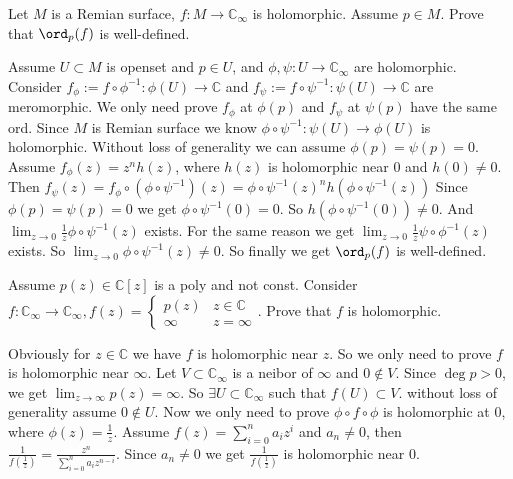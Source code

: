 \documentclass{ctexart}
\begin{document}
\begin{problem}
  Let \(M\) is a Remian surface, \(f:M \to \mathbb{C}_{\infty}\) is holomorphic. Assume \(p \in M\). 
  Prove that \(\ord_p(f)\) is well-defined. 
\end{problem}

\begin{solution}
  Assume \(U \subset M\) is openset and \(p \in U\), and \(\phi,\psi:U \to \mathbb{C}_{\infty}\) are holomorphic. 
  Consider \(f_\phi:=f \circ \phi^{-1}:\phi(U)\to \mathbb{C}\) and \(f_\psi:=f \circ \psi^{-1}:\psi(U) \to \mathbb{C}\) are meromorphic. 
  We only need prove \(f_\phi\) at \(\phi(p)\) and \(f_\psi\) at \(\psi(p)\) have the same ord. 
  Since \(M\) is Remian surface we know \(\phi \circ \psi^{-1}:\psi(U)\to \phi(U)\) is holomorphic. 
  Without loss of generality we can assume \(\phi(p)=\psi(p)=0\). 
  Assume \(f_\phi(z)=z^nh(z)\), where \(h(z)\) is holomorphic near \(0\) and \(h(0)\neq 0\). 
  Then \(f_\psi(z)=f_{\phi}\circ (\phi \circ \psi^{-1})(z)=\phi \circ \psi^{-1} (z)^n h(\phi \circ \psi^{-1}(z))\)
  Since \(\phi(p)=\psi(p)=0\) we get \(\phi \circ \psi^{-1}(0)=0\). So \(h(\phi \circ \psi^{-1}(0)) \neq 0\). 
  And \(\lim_{z \to 0}\frac{1}{z}\phi \circ \psi^{-1}(z)\) exists. 
  For the same reason we get \(\lim_{z \to 0}\frac{1}{z}\psi \circ \phi^{-1}(z)\) exists. 
  So \(\lim_{z \to 0}\phi \circ \psi^{-1}(z)\neq 0\). 
  So finally we get \(\ord_p(f)\) is well-defined. 
\end{solution}

\begin{problem}
  Assume \(p(z)\in \mathbb{C}[z]\) is a poly and not const. 
  Consider \(f:\mathbb{C}_{\infty}\to \mathbb{C}_{\infty},f(z)= \begin{cases}
  p(z) & z \in \mathbb{C}\\
  \infty & z=\infty
  \end{cases}\). 
  Prove that \(f\) is holomorphic. 
\end{problem}

\begin{solution}
  Obviously for \(z \in \mathbb{C}\) we have \(f\) is holomorphic near \(z\). So we only need to prove \(f\) is holomorphic near \(\infty\). 
  Let \(V \subset \mathbb{C}_{\infty}\) is a neibor of \(\infty\) and \(0 \notin V\). 
  Since \(\deg p>0\), we get \(\lim_{z \to \infty}p(z)=\infty\). 
  So \(\exists U \subset \mathbb{C}_{\infty}\) such that \(f(U)\subset V\). without loss of generality assume \(0 \notin U\). 
  Now we only need to prove \(\phi \circ f \circ \phi\) is holomorphic at \(0\), where \(\phi(z)=\frac{1}{z}\). 
  Assume \(f(z)=\sum_{i=0}^n a_i z^i\) and \(a_n \neq 0\), then \(\frac{1}{f(\frac{1}{z})}=\frac{z^n}{\sum_{i=0}^n a_i z^{n-i}}\). 
  Since \(a_n \neq 0\) we get \(\frac{1}{f(\frac{1}{z})}\) is holomorphic near \(0\). 
\end{solution}
\end{document}
